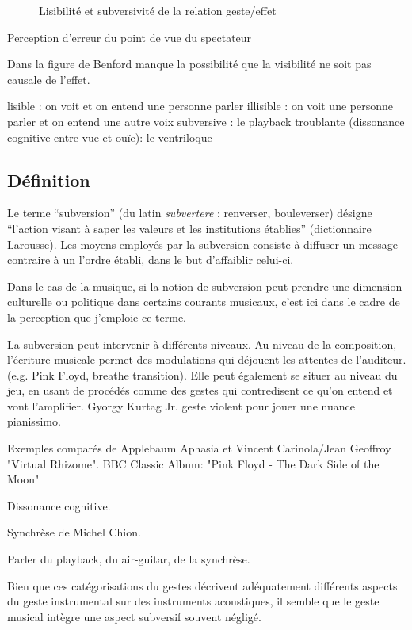\begin{figure}[!htbp]
\begin{minipage}[t]{0.48\textwidth}
		\caption{Lisibilité et subversivité de la relation geste/effet}
		\label{fig:gesture:lisibility_subversion}
	\end{minipage}
\end{figure}


Perception d'erreur du point de vue du spectateur \cite{fyans_ecological_2012}

Dans la figure de Benford manque la possibilité que la visibilité ne soit pas causale de l'effet.

lisible : on voit et on entend une personne parler
illisible : on voit une personne parler et on entend une autre voix
subversive : le playback
troublante (dissonance cognitive entre vue et ouïe): le ventriloque

\subsection{Définition} 

Le terme ``subversion'' (du latin \textit{subvertere} : renverser, bouleverser) désigne ``l'action visant à saper les valeurs et les institutions établies'' (dictionnaire Larousse). Les moyens employés par la subversion consiste à diffuser un message contraire à un l'ordre établi, dans le but d'affaiblir celui-ci.

Dans le cas de la musique, si la notion de subversion peut prendre une dimension culturelle ou politique dans certains courants musicaux, c'est ici dans le cadre de la perception que j'emploie ce terme.

La subversion peut intervenir à différents niveaux. Au niveau de la composition, l'écriture musicale permet des modulations qui déjouent les attentes de l'auditeur. (e.g. Pink Floyd, breathe transition). Elle peut également se situer au niveau du jeu, en usant de procédés comme des gestes qui contredisent ce qu'on entend et vont l'amplifier. Gyorgy Kurtag Jr. geste violent pour jouer une nuance pianissimo.

Exemples comparés de Applebaum Aphasia et Vincent Carinola/Jean Geoffroy "Virtual Rhizome".
BBC Classic Album: "Pink Floyd - The Dark Side of the Moon"

Dissonance cognitive.

Synchrèse de Michel Chion.

Parler du playback, du air-guitar, de la synchrèse.

Bien que ces catégorisations du gestes décrivent adéquatement différents aspects du geste instrumental sur des instruments acoustiques, il semble que le geste musical intègre une aspect subversif souvent négligé.


